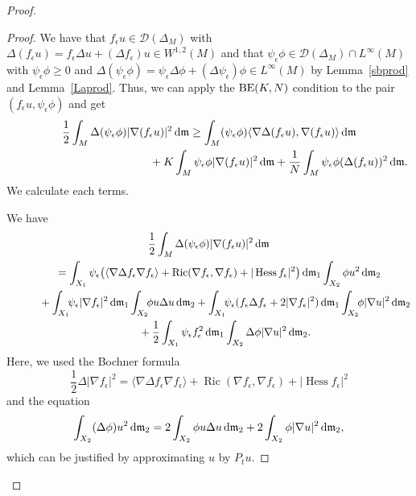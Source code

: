 \documentclass[pdftex]{sigma}
\numberwithin{equation}{section}
\theoremstyle{definition}
\newcommand{\Ric}{\operatorname{Ric}}
\newcommand{\Hess}{\operatorname{Hess}}
\newcommand{\mf}{\mathfrak{m}}
\newcommand{\BE}{{\rm BE}}
\newcommand{\D}{\mathcal{D}}
\begin{document}
\begin{proof}
\begin{proof}
We have that $f_\epsilon u\in\D(\Delta_M)$ with $\Delta(f_\epsilon u)=f_\epsilon \Delta u+(\Delta f_\epsilon)u\in W^{1,2}(M)$ and that $\psi_\epsilon \phi\in \D(\Delta_M)\cap L^\infty(M)$ with $\psi_\epsilon\phi\geq 0$ and $\Delta(\psi_\epsilon \phi)=\psi_\epsilon \Delta \phi+(\Delta \psi_\epsilon)\phi\in L^\infty (M)$ by Lemma~\ref{sbprod} and Lemma~\ref{Laprod}.
Thus, we can apply the $\BE(K,N)$ condition to the pair $(f_\epsilon u, \psi_\epsilon \phi)$ and get
\begin{gather}
\frac{1}{2}\int_M \Delta(\psi_\epsilon \phi)|\nabla(f_\epsilon u)|^2\,{\rm d}\mf
\geq\int_M (\psi_\epsilon \phi)\langle\nabla \Delta(f_\epsilon u),\nabla(f_\epsilon u) \rangle\,{\rm d}\mf\nonumber
\\ \hphantom{\frac{1}{2}\int_M \Delta(\psi_\epsilon \phi)|\nabla(f_\epsilon u)|^2\,{\rm d}\mf
\geq}
\label{3a}
+K\int_M \psi_\epsilon \phi |\nabla (f_\epsilon u)|^2\,{\rm d}\mf+
\frac{1}{N}\int_M \psi_\epsilon \phi(\Delta(f_\epsilon u))^2\,{\rm d}\mf.
\end{gather}
We calculate each terms.


We have
\begin{gather}
\frac{1}{2}\int_M \Delta(\psi_\epsilon \phi)|\nabla(f_\epsilon u)|^2\,{\rm d}\mf\nonumber
\\ \qquad
=\int_{X_1}\psi_\epsilon\big(\langle\nabla \Delta f_\epsilon\nabla f_\epsilon\rangle+\Ric(\nabla f_\epsilon,\nabla f_\epsilon)+|\Hess f_\epsilon|^2\big)\,{\rm d}\mf_1
\int_{X_2}\phi u^2\,{\rm d}\mf_2\nonumber
\\ \qquad\quad
{}+\int_{X_1}\!\! \psi_\epsilon |\nabla f_\epsilon|^2\,{\rm d}\mf_1\int_{X_2}\!\!\phi u\Delta u\,{\rm d}\mf_2
+\int_{X_1} \!\!\psi_\epsilon (f_\epsilon \Delta f_\epsilon +2|\nabla f_\epsilon|^2)\,{\rm d}\mf_1\int_{X_2}\!\!\phi|\nabla u|^2\,{\rm d}\mf_2
\nonumber
\\ \qquad\quad{}
+\frac{1}{2}\int_{X_1}\psi_\epsilon f_\epsilon^2 \,{\rm d}\mf_1\int_{X_2}\Delta \phi |\nabla u|^2\,{\rm d}\mf_2.
\label{3b}
\end{gather}
Here, we used the Bochner formula
\[\frac{1}{2}\Delta|\nabla f_\epsilon|^2=\langle\nabla \Delta f_\epsilon\nabla f_\epsilon\rangle+\Ric(\nabla f_\epsilon,\nabla f_\epsilon)+|\Hess f_\epsilon|^2\]
and the equation
\[
\int_{X_2} (\Delta \phi )u^2\,{\rm d}\mf_2=2\int_{X_2} \phi u\Delta u\,{\rm d}\mf_2+2\int_{X_2}\phi|\nabla u|^2\,{\rm d}\mf_2,
\]
which can be justified by approximating $u$ by $P_t u$.


\end{proof}
\end{proof}
\end{document}

